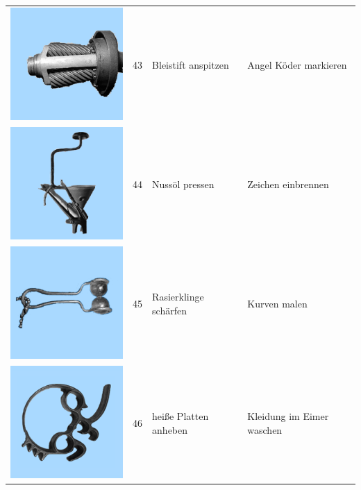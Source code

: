\documentclass[
  english,
  doc,12pt,twoside,floatsintext]{apa7}
\begin{document}
\begin{center}
\begin{ThreePartTable}
\begin{longtable}{llll}
\includegraphics[valign=c, scale=0.19]{../materials/unfamiliar/43.png} & 43 & Bleistift anspitzen & Angel Köder markieren\\
\includegraphics[valign=c, scale=0.19]{../materials/unfamiliar/44.png} & 44 & Nussöl pressen & Zeichen einbrennen\\
\includegraphics[valign=c, scale=0.19]{../materials/unfamiliar/45.png} & 45 & Rasierklinge schärfen & Kurven malen\\
\includegraphics[valign=c, scale=0.19]{../materials/unfamiliar/46.png} & 46 & heiße Platten anheben & Kleidung im Eimer waschen\\

\end{longtable}
\end{ThreePartTable}
\end{center}
\end{document}
